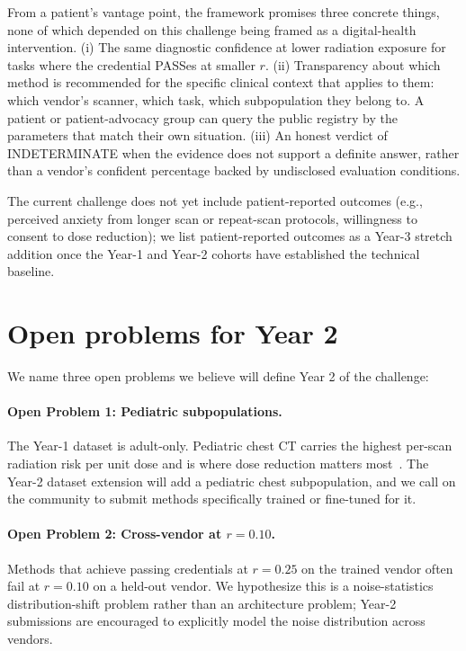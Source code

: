 \documentclass[twoside,11pt]{article}
\begin{document}
From a patient's vantage point, the framework promises three concrete things, none of which depended on this challenge being framed as a digital-health intervention. (i) The same diagnostic confidence at lower radiation exposure for tasks where the credential PASSes at smaller $r$. (ii) Transparency about which method is recommended for the specific clinical context that applies to them: which vendor's scanner, which task, which subpopulation they belong to. A patient or patient-advocacy group can query the public registry by the parameters that match their own situation. (iii) An honest verdict of INDETERMINATE when the evidence does not support a definite answer, rather than a vendor's confident percentage backed by undisclosed evaluation conditions.

The current challenge does not yet include patient-reported outcomes (e.g., perceived anxiety from longer scan or repeat-scan protocols, willingness to consent to dose reduction); we list patient-reported outcomes as a Year-3 stretch addition once the Year-1 and Year-2 cohorts have established the technical baseline.

\section{Open problems for Year 2}
\label{sec:open_problems}

We name three open problems we believe will define Year 2 of the challenge:

\paragraph{Open Problem 1: Pediatric subpopulations.} The Year-1 dataset is adult-only. Pediatric chest CT carries the highest per-scan radiation risk per unit dose and is where dose reduction matters most~\citep{larson2018pediatric}. The Year-2 dataset extension will add a pediatric chest subpopulation, and we call on the community to submit methods specifically trained or fine-tuned for it.

\paragraph{Open Problem 2: Cross-vendor at $r = 0.10$.} Methods that achieve passing credentials at $r = 0.25$ on the trained vendor often fail at $r = 0.10$ on a held-out vendor. We hypothesize this is a noise-statistics distribution-shift problem rather than an architecture problem; Year-2 submissions are encouraged to explicitly model the noise distribution across vendors.
\end{document}
